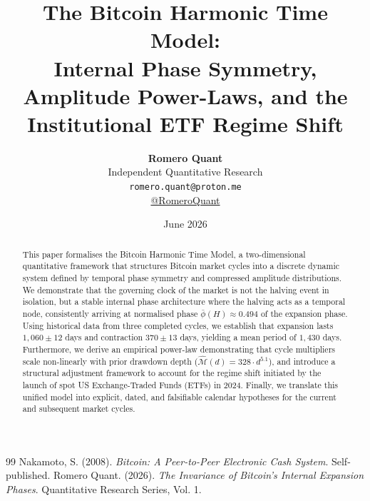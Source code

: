\documentclass[11pt,a4paper,oneside]{article}
\title{\textbf{The Bitcoin Harmonic Time Model:\\
Internal Phase Symmetry, Amplitude Power-Laws, and the Institutional ETF Regime Shift}}
\author{\textbf{Romero Quant} \\
\small Independent Quantitative Research \\
\small \texttt{romero.quant@proton.me} \\
\small \href{https://x.com/RomeroQuant}{@RomeroQuant}}
\date{\small June 2026}
\theoremstyle{definition}
\begin{document}
\maketitle

\begin{abstract}
This paper formalises the Bitcoin Harmonic Time Model, a two-dimensional quantitative framework that structures Bitcoin market cycles into a discrete dynamic system defined by temporal phase symmetry and compressed amplitude distributions. We demonstrate that the governing clock of the market is not the halving event in isolation, but a stable internal phase architecture where the halving acts as a temporal node, consistently arriving at normalised phase $\bar{\phi}(H) \approx 0.494$ of the expansion phase. Using historical data from three completed cycles, we establish that expansion lasts $1{,}060 \pm 12$ days and contraction $370 \pm 13$ days, yielding a mean period of $1{,}430$ days. Furthermore, we derive an empirical power-law demonstrating that cycle multipliers scale non-linearly with prior drawdown depth ($\hat{\mathcal{M}}(d) = 328 \cdot d^{5.1}$), and introduce a structural adjustment framework to account for the regime shift initiated by the launch of spot US Exchange-Traded Funds (ETFs) in 2024. Finally, we translate this unified model into explicit, dated, and falsifiable calendar hypotheses for the current and subsequent market cycles.
\end{abstract}

\newpage
\tableofcontents
\newpage








\begin{thebibliography}{99}
Nakamoto, S. (2008). \textit{Bitcoin: A Peer-to-Peer Electronic Cash System}. Self-published.
Romero Quant. (2026). \textit{The Invariance of Bitcoin's Internal Expansion Phases}. Quantitative Research Series, Vol. 1.
\end{thebibliography}
\end{document}
